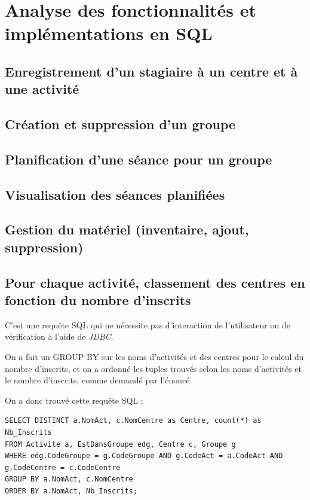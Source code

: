 \documentclass[10pt]{article}
\begin{document}
\section{Analyse des fonctionnalités et implémentations en SQL}

\subsection{Enregistrement d'un stagiaire à un centre et à une activité}

\subsection{Création et suppression d'un groupe}

\subsection{Planification d'une séance pour un groupe}

\subsection{Visualisation des séances planifiées}

\subsection{Gestion du matériel (inventaire, ajout, suppression)}

\subsection{Pour chaque activité, classement des centres en fonction du nombre d'inscrits}

C'est une requête SQL qui ne nécessite pas d'interaction de l'utilisateur ou de vérification à l'aide de \emph{JDBC}. 

On a fait un GROUP BY sur les noms d'activités et des centres pour le calcul du nombre d'inscrits, et on a ordonné les tuples trouvés 
selon les noms d'activités et le nombre d'inscrits, comme demandé par l'énoncé.

On a donc trouvé cette requête SQL :

\begin{small}
\begin{verbatim}
SELECT DISTINCT a.NomAct, c.NomCentre as Centre, count(*) as Nb_Inscrits
FROM Activite a, EstDansGroupe edg, Centre c, Groupe g
WHERE edg.CodeGroupe = g.CodeGroupe AND g.CodeAct = a.CodeAct AND g.CodeCentre = c.CodeCentre
GROUP BY a.NomAct, c.NomCentre
ORDER BY a.NomAct, Nb_Inscrits;
\end{verbatim}
\end{small}
\end{document}
